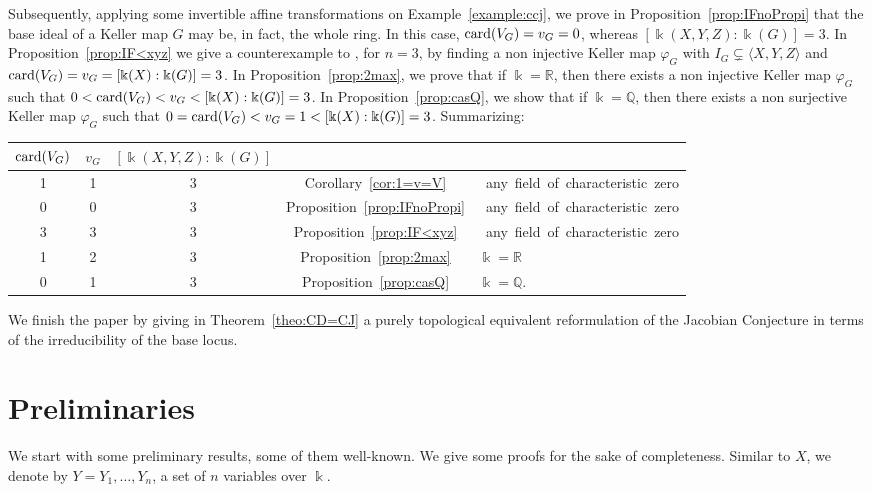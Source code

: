 \documentclass[11pt,reqno]{amsart}
\theoremstyle{definition}
\newcommand{\mbk}{\mbox{$\Bbbk$}}
\newcommand{\mbq}{\mbox{$\mathbb{Q}$}}
\newcommand{\mbr}{\mbox{$\mathbb{R}$}}
\newcommand{\card}{\mbox{${\rm card}$}}
\begin{document}
Subsequently, applying some invertible affine transformations on Example~\ref{example:ccj}, we prove in Proposition~\ref{prop:IFnoPropi} that the base ideal of a Keller map $G$ may be, in fact, the whole ring. In this case, $\card(V_G)=v_G=0$, whereas $[\mbk(X,Y,Z):\mbk(G)]=3$.
In Proposition~\ref{prop:IF<xyz} we give a counterexample to \cite[Conjecture C]{mn}, for $n=3$, by finding a non injective Keller map $\varphi_G$ with $I_G\subsetneq \langle X,Y,Z\rangle$ and 
$\card(V_G)=v_G=[\mbk(X):\mbk(G)]=3$. 
In Proposition~\ref{prop:2max}, we prove that
if $\mbk=\mbr$, then there exists a non injective Keller map $\varphi_G$ such that 
$0<\card(V_G)<v_G<[\mbk(X):\mbk(G)]=3$. In Proposition~\ref{prop:casQ}, we show that if $\mbk=\mbq$, then there exists a non surjective Keller map $\varphi_G$ such that $0=\card(V_G)<v_G=1<[\mbk(X):\mbk(G)]=3$.
Summarizing:
\vspace*{0.2cm}
\begin{center}
\begin{tabular}{c|c|c|c|l}
$\card(V_G)$   & $v_G$ & $[\mbk(X,Y,Z):\mbk(G)]$ && \\\hline
1 & 1 & 3 & Corollary~\ref{cor:1=v=V}&\mbox{ any field of characteristic zero}\\
0 & 0 & 3 & Proposition~\ref{prop:IFnoPropi}&\mbox{ any field of characteristic zero}\\
3 & 3 & 3 & Proposition~\ref{prop:IF<xyz}&\mbox{ any field of characteristic zero}\\
\hline
1 & 2 & 3 & Proposition~\ref{prop:2max} & \; $\mbk=\mbr$\\ \hline
0 & 1 & 3 & Proposition~\ref{prop:casQ} & \; $\mbk=\mbq$. 
\end{tabular}
\end{center}
\vspace*{0.2cm}

We finish the paper by giving in Theorem~\ref{theo:CD=CJ} a purely topological equivalent reformulation 
of the Jacobian Conjecture in terms of the irreducibility of the base locus. 

\section{Preliminaries}

We start with some preliminary results, some of them well-known. We give some proofs for the sake of completeness. Similar to $X$, we denote by $Y=Y_1,\ldots,Y_n$, a set of $n$ variables over $\mbk$.
\end{document}
